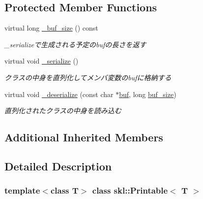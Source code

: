 \subsection*{Protected Member Functions}
\begin{DoxyCompactItemize}
\item 
\hypertarget{classskl_1_1_printable_a79a8c40232c97197722b0e50c3bc3ccf}{}\label{classskl_1_1_printable_a79a8c40232c97197722b0e50c3bc3ccf} 
virtual long \hyperlink{classskl_1_1_printable_a79a8c40232c97197722b0e50c3bc3ccf}{\+\_\+buf\+\_\+size} () const
\begin{DoxyCompactList}\small\item\em \+\_\+serializeで生成される予定のbufの長さを返す \end{DoxyCompactList}\item 
\hypertarget{classskl_1_1_printable_ab7ee46a0d3fd3536af70929e477eefd4}{}\label{classskl_1_1_printable_ab7ee46a0d3fd3536af70929e477eefd4} 
virtual void \hyperlink{classskl_1_1_printable_ab7ee46a0d3fd3536af70929e477eefd4}{\+\_\+serialize} ()
\begin{DoxyCompactList}\small\item\em クラスの中身を直列化してメンバ変数のbufに格納する \end{DoxyCompactList}\item 
\hypertarget{classskl_1_1_printable_a1f05fcd22b8e76f3e2da7d60f31afb58}{}\label{classskl_1_1_printable_a1f05fcd22b8e76f3e2da7d60f31afb58} 
virtual void \hyperlink{classskl_1_1_printable_a1f05fcd22b8e76f3e2da7d60f31afb58}{\+\_\+deserialize} (const char $\ast$\hyperlink{classskl_1_1_serializable_a1d203d9f0049ce37183a0dcefbc6399a}{buf}, long \hyperlink{classskl_1_1_serializable_a087eb19fada917a42b8411bfecbac0f1}{buf\+\_\+size})
\begin{DoxyCompactList}\small\item\em 直列化されたクラスの中身を読み込む \end{DoxyCompactList}\end{DoxyCompactItemize}
\subsection*{Additional Inherited Members}


\subsection{Detailed Description}
\subsubsection*{template$<$class T$>$\newline
class skl\+::\+Printable$<$ T $>$}

